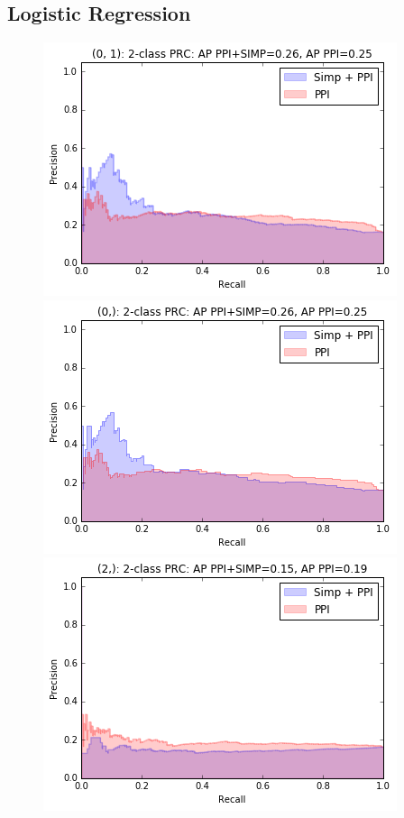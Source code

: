 \documentclass[9pt]{article}
\begin{document}
{\subsection{Logistic Regression}
\begin{figure}[!htb]
  \includegraphics[width=\linewidth]{logisticRegressionGraphs/logr1.png}
\endminipage\hfill
{}
  \includegraphics[width=\linewidth]{logisticRegressionGraphs/logr3.png}
\endminipage\hfill
{}%
  \includegraphics[width=\linewidth]{logisticRegressionGraphs/logr6.png}

\end{figure}}
\end{document}

